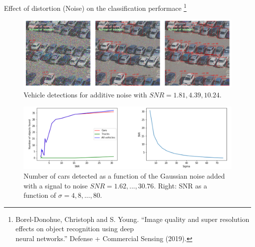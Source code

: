 \documentclass{libs/ufc_format}
\begin{document}
\begin{frame}{\small Effect of distortion (Noise) on the classification performace \footnote[frame]{\tiny Borel-Donohue, Christoph and S. Young. “Image quality and super resolution effects on object recognition using deep \\ neural networks.” Defense + Commercial Sensing (2019).}}
    \begin{figure}
        \centering
        \includegraphics[scale=0.15]{libs/noiseeffect.png}
        \caption{Vehicle detections for additive noise with $SNR = {1.81, 4.39, 10.24}$.}
        \label{fig:challengenoise}
    \end{figure}

    \begin{figure}
        \centering
        \includegraphics[scale=0.15]{libs/noiseeffect2.png}
        \caption{Number of cars detected as a function of the Gaussian noise added with a signal to noise $SNR = {1.62,..., 30.76}$. Right: SNR as a function of $\sigma = {4, 8,..., 80}$.}
        \label{fig:challengenoise2}
    \end{figure}

\end{frame}
\end{document}
